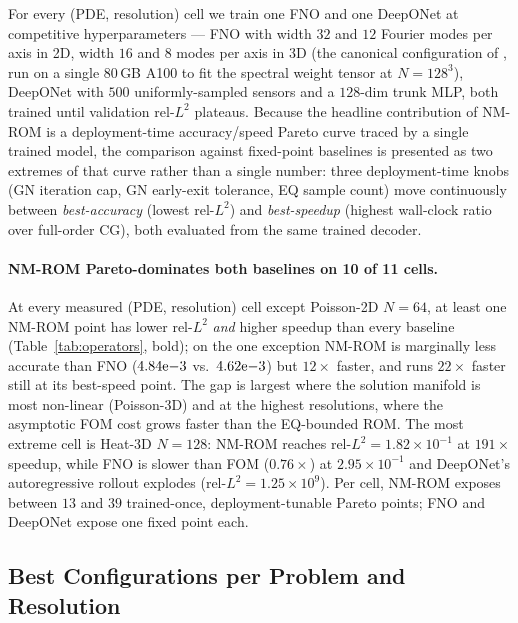 \documentclass{article}
\begin{document}
  For every (PDE, resolution) cell we train one FNO and one DeepONet at
  competitive hyperparameters --- FNO with width $32$ and $12$ Fourier
  modes per axis in 2D, width $16$ and $8$ modes per axis in 3D
  (the canonical configuration of \citet{Li2020FNO}, run on a
  single $80$\,GB A100 to fit the spectral weight tensor at
  $N{=}128^3$), DeepONet with $500$ uniformly-sampled sensors and a
  $128$-dim trunk MLP, both trained until validation rel-$L^2$
  plateaus. Because the headline contribution of NM-ROM is a
  deployment-time accuracy/speed Pareto curve traced by a single
  trained model, the comparison against fixed-point baselines is
  presented as two extremes of that curve rather than a single number:
  three deployment-time knobs (GN iteration cap, GN early-exit
  tolerance, EQ sample count) move continuously between
  \emph{best-accuracy} (lowest rel-$L^2$) and \emph{best-speedup}
  (highest wall-clock ratio over full-order CG), both evaluated from
  the same trained decoder.
                                                                                                           
  \paragraph{NM-ROM Pareto-dominates both baselines on 10 of 11 cells.}
  At every measured (PDE, resolution) cell except Poisson-2D
  $N{=}64$, at least one NM-ROM point has lower rel-$L^2$
  \emph{and} higher speedup than every baseline
  (Table~\ref{tab:operators}, bold); on the one exception NM-ROM is
  marginally less accurate than FNO ($4.84{\rm e}{-3}$ vs.\
  $4.62{\rm e}{-3}$) but $12\times$ faster, and runs $22\times$
  faster still at its best-speed point. The gap is largest where the
  solution manifold is most non-linear (Poisson-3D) and at the
  highest resolutions, where the asymptotic FOM cost grows faster
  than the EQ-bounded ROM. The most extreme cell is Heat-3D
  $N{=}128$: NM-ROM reaches rel-$L^2 = 1.82\times 10^{-1}$ at
  $191\times$ speedup, while FNO is slower than FOM
  ($0.76\times$) at $2.95\times 10^{-1}$ and DeepONet's
  autoregressive rollout explodes (rel-$L^2 = 1.25\times 10^{9}$).
  Per cell, NM-ROM exposes between $13$ and $39$ trained-once,
  deployment-tunable Pareto points; FNO and DeepONet expose one
  fixed point each.

  \subsection{Best Configurations per Problem and Resolution}
  \label{sec:results:best}
                                                                                                           
\end{document}
